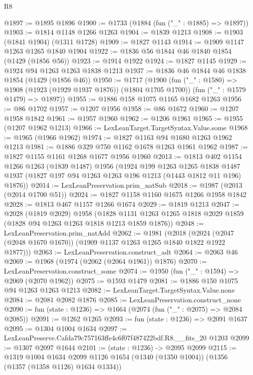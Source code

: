 \begin{lexlean}{R8}
\begin{coremodule}
@1897 := @1895 @1896
@1900 := @1733 (@1884 (fun ("_" : @1885) => @1897))
@1903 := @1814 @1148 @1266 @1263
@1904 := @1839 @1213
@1908 := @1903 (@1841 @1904) (@1311 @1728)
@1909 := @1827 @1143
@1914 := @1909 @1147 @1263 @1265 @1840 @1904
@1922 := @1836 @56 @1844 @46 @1840 @1854 (@1429 (@1856 @56))
@1923 := @1914 @1922
@1924 := @1827 @1145
@1929 := @1924 @94 @1263 @1263 @1838 @1213
@1937 := @1836 @46 @1844 @46 @1838 @1854 (@1429 (@1856 @46))
@1950 := @1717
    (@1900
      (fun ("_" : @1580) => @1908 (@1923 (@1929 @1937 @1876)) (@1804 @1705 @1700))
      (fun ("_" : @1579 @1479) => @1897))
@1955 := @1886 @158 @1075 @1165 @1682 @1263
@1956 := @86 @1702
@1957 := @1207 @1956
@1958 := @86 @1672
@1960 := @1207 @1958 @1842
@1961 := @1957 @1960
@1962 := @1206 @1961
@1965 := @1955 (@1207 @1962 @1213)
@1966 := LexLeanTarget.TargetSyntax.Value.some
@1968 := @1965 (@1966 @1962)
@1974 := @1827 @1163 @94 @1680 @1263 @1962 @1213
@1981 := @1886 @329 @750 @1162 @1678 @1263 @1961 @1962
@1987 := @1827 @1155 @1161 @1268 @1677 @1956 @1960
@2013 := @1813
    @402
    @1154
    @1266
    @1263
    (@1839 @1487)
    @1956
    (@1924
      @199
      @1263
      @1265
      @1838
      @1487
      @1937
      (@1827 @197 @94 @1263 @1263 @196 @1213 (@1443 @1812 @11 @196) @1876))
@2014 := LexLeanPreservation.prim_natSub
@2018 := @1987 (@2013 (@2014 @1700 @51))
@2024 := @1827 @1158 @1160 @1675 @1266 @1958 @1842
@2028 := @1813 @467 @1157 @1266 @1674
@2029 := @1819 @1213
@2047 := @2028
    (@1819 @2029)
    @1958
    (@1828 @1131 @1263 @1265 @1818 @2029 @1859 (@1828 @94 @1263 @1263 @1818 @1213 @1859 @1876))
@2048 := LexLeanPreservation.prim_natAdd
@2062 := @1981
    (@2018 (@2024 (@2047 (@2048 @1670 @1670)) (@1909 @1137 @1263 @1265 @1840 @1822 @1922 @1877)))
@2063 := LexLeanPreservation.construct_adt
@2064 := @2063 @46
@2069 := @1968 (@1974 (@2062 (@2064 @1961)) @1876)
@2070 := LexLeanPreservation.construct_some
@2074 := @1950 (fun ("_" : @1594) => @2069 (@2070 @1962))
@2075 := @1593 @1479
@2081 := @1886 @150 @1075 @94 @1263 @1263 @1213
@2082 := LexLeanTarget.TargetSyntax.Value.none
@2084 := @2081 @2082 @1876
@2085 := LexLeanPreservation.construct_none
@2090 := fun (state : @1236) => @1664 (@2074 (fun ("_" : @2075) => @2084 @2085))
@2091 := @1262 @1265
@2093 := fun (state : @1236) => @2091 @1637
@2095 := @1304 @1004 @1634
@2097 := LexLeanPreserve.Cafda79c757163ffe4c6f07f487422bdf.R8.__fits_20 @1203
@2099 := @1307 @2097 @1644
@2101 := (state : @1236) -> @2095 @2099
@2115 := @1319
    @1004
    @1634
    @2099
    @1126
    @1654
    (@1340 (@1350 @1004))
    (@1356 (@1357 (@1358 @1126) @1634 @1334))

\end{coremodule}
\end{lexlean}
